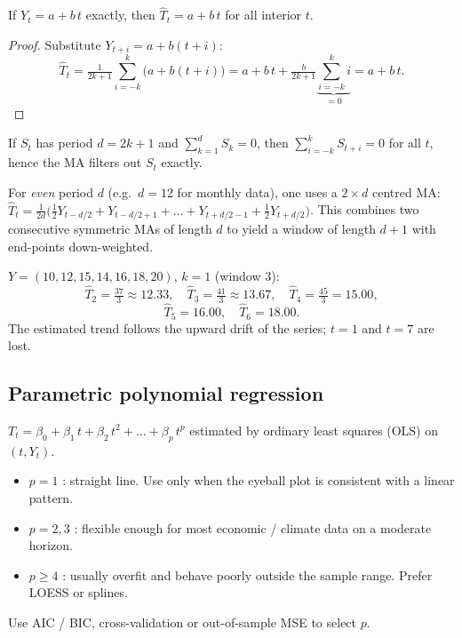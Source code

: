 \begin{propbox}
\label{prop:ma-linear}
If $Y_t = a + b\,t$ exactly, then $\widehat{T}_t = a + b\,t$ for all
interior $t$.
\end{propbox}

\begin{proof}
Substitute $Y_{t+i} = a + b(t + i)$:
\[
  \widehat{T}_t = \tfrac{1}{2k+1}\sum_{i = -k}^{k}\bigl(a + b(t+i)\bigr)
  = a + b\,t + \tfrac{b}{2k+1}\underbrace{\sum_{i=-k}^{k} i}_{= 0}
  = a + b\,t.
\]
\end{proof}

\begin{propbox}
\label{prop:ma-season}
If $S_t$ has period $d = 2k + 1$ and $\sum_{k=1}^{d} S_k = 0$, then
$\sum_{i = -k}^{k} S_{t + i} = 0$ for all $t$, hence the MA filters out
$S_t$ exactly.
\end{propbox}

\begin{rembox}
For \emph{even} period $d$ (e.g.\ $d = 12$ for monthly data), one uses
a $2 \times d$ centred MA:
$\widehat{T}_t = \tfrac{1}{2d}\bigl(\tfrac{1}{2}Y_{t-d/2} + Y_{t-d/2+1}
+ \dots + Y_{t+d/2-1} + \tfrac{1}{2}Y_{t+d/2}\bigr)$.
This combines two consecutive symmetric MAs of length $d$ to yield a
window of length $d + 1$ with end-points down-weighted.
\end{rembox}

\begin{exbox}
$Y = (10, 12, 15, 14, 16, 18, 20)$, $k = 1$ (window 3):
\[
  \widehat{T}_2 = \tfrac{37}{3} \approx 12.33, \quad
  \widehat{T}_3 = \tfrac{41}{3} \approx 13.67, \quad
  \widehat{T}_4 = \tfrac{45}{3} = 15.00,
\]
\[
  \widehat{T}_5 = 16.00, \quad
  \widehat{T}_6 = 18.00.
\]
The estimated trend follows the upward drift of the series; $t = 1$
and $t = 7$ are lost.
\end{exbox}

\subsection{Parametric polynomial regression}

\begin{defbox}
$T_t = \beta_0 + \beta_1\, t + \beta_2\, t^2 + \dots + \beta_p\, t^p$
estimated by ordinary least squares (OLS) on $(t, Y_t)$.
\end{defbox}

\begin{rembox}
\begin{itemize}
  \item $p = 1$ : straight line. Use only when the eyeball plot is
        consistent with a linear pattern.
  \item $p = 2, 3$ : flexible enough for most economic / climate data
        on a moderate horizon.
  \item $p \geq 4$ : usually overfit and behave poorly outside the
        sample range. Prefer LOESS or splines.
\end{itemize}
Use AIC / BIC, cross-validation or out-of-sample MSE to select $p$.
\end{rembox}

